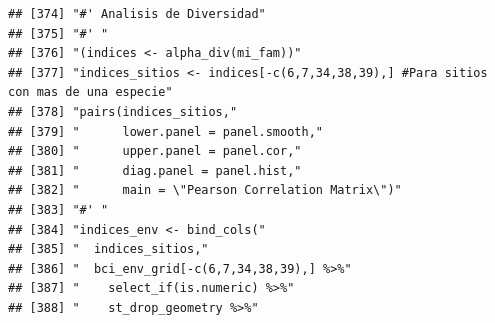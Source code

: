 \documentclass[11pt,]{article}
\begin{document}
\begin{verbatim}
## [374] "#' Analisis de Diversidad"                                                                                                                                             
## [375] "#' "                                                                                                                                                                   
## [376] "(indices <- alpha_div(mi_fam))"                                                                                                                                        
## [377] "indices_sitios <- indices[-c(6,7,34,38,39),] #Para sitios con mas de una especie"                                                                                      
## [378] "pairs(indices_sitios,"                                                                                                                                                 
## [379] "      lower.panel = panel.smooth,"                                                                                                                                     
## [380] "      upper.panel = panel.cor,"                                                                                                                                        
## [381] "      diag.panel = panel.hist,"                                                                                                                                        
## [382] "      main = \"Pearson Correlation Matrix\")"                                                                                                                          
## [383] "#' "                                                                                                                                                                   
## [384] "indices_env <- bind_cols("                                                                                                                                             
## [385] "  indices_sitios,"                                                                                                                                                     
## [386] "  bci_env_grid[-c(6,7,34,38,39),] %>%"                                                                                                                                 
## [387] "    select_if(is.numeric) %>%"                                                                                                                                         
## [388] "    st_drop_geometry %>%"                                                                                                                                              

\end{verbatim}
\end{document}
